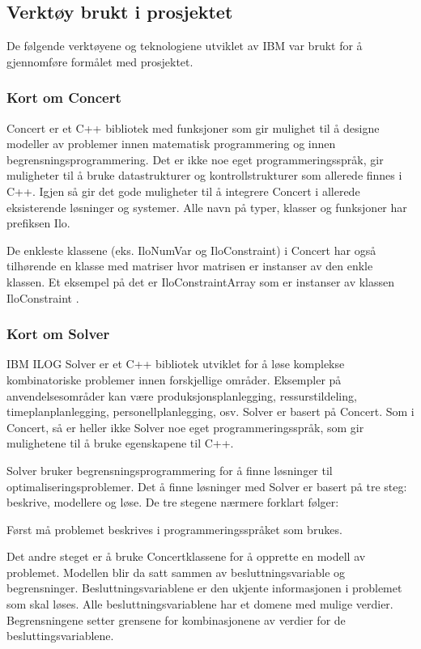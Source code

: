 \subsection{Verktøy brukt i prosjektet}
De følgende verktøyene og teknologiene utviklet av IBM var brukt for å gjennomføre formålet med prosjektet.

\subsubsection{Kort om Concert}
Concert er et C++ bibliotek med funksjoner som gir mulighet til å designe modeller av problemer innen matematisk programmering og innen begrensningsprogrammering. Det er ikke noe eget programmeringsspråk, gir muligheter til å bruke datastrukturer og kontrollstrukturer som allerede finnes i C++. Igjen så gir det gode muligheter til å integrere Concert i allerede eksisterende løsninger og systemer. Alle navn på typer, klasser og funksjoner har prefiksen Ilo.

De enkleste klassene (eks. IloNumVar og IloConstraint) i Concert har også tilhørende en klasse med matriser hvor matrisen er instanser av den enkle klassen. Et eksempel på det er IloConstraintArray som er instanser av klassen IloConstraint \cite{cpconcertilog}.

\subsubsection{Kort om Solver}
IBM ILOG Solver er et C++ bibliotek utviklet for å løse komplekse kombinatoriske problemer innen forskjellige områder. Eksempler på anvendelsesområder kan være produksjonsplanlegging, ressurstildeling, timeplanplanlegging, personellplanlegging, osv. Solver er basert på Concert. Som i Concert, så er heller ikke Solver noe eget programmeringsspråk, som gir mulighetene til å bruke egenskapene til C++.

Solver bruker begrensningsprogrammering for å finne løsninger til optimaliseringsproblemer. Det å finne løsninger med Solver er basert på tre steg: beskrive, modellere og løse. De tre stegene nærmere forklart følger:

Først må problemet beskrives i programmeringsspråket som brukes.

Det andre steget er å bruke Concertklassene for å opprette en modell av problemet. Modellen blir da satt sammen av besluttningsvariable og begrensninger. Besluttningsvariablene er den ukjente informasjonen i problemet som skal løses. Alle besluttningsvariablene har et domene med mulige verdier. Begrensningene setter grensene for kombinasjonene av verdier for de besluttingsvariablene.

